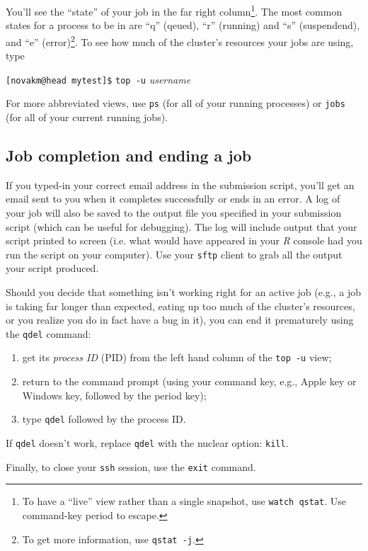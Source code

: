\documentclass[12pt,letterpaper]{article}
\begin{document}
\noindent
You'll see the ``state'' of your job in the far right column\footnote{To have a ``live'' view rather than a single snapshot, use \texttt{watch qstat}.  Use command-key period to escape.}.
The most common states for a process to be in are ``q'' (qeued), ``r'' (running) and ``s'' (suspendend), and ``e'' (error)\footnote{To get more information, use \texttt{qstat -j}.}.
To see how much of the cluster's resources your jobs are using, type

\texttt{[novakm@head mytest]\$} \texttt{top -u} \emph{username}

\noindent
For more abbreviated views, use \texttt{ps} (for all of your running processes) or \texttt{jobs} (for all of your current running jobs).


\subsection{Job completion and ending a job}
If you typed-in your correct email address in the submission script, you'll get an email sent to you when it completes successfully or ends in an error.
A log of your job will also be saved to the output file you specified in your submission script (which can be useful for debugging).
The log will include output that your script printed to screen (i.e. what would have appeared in your \emph{R} console had you run the script on your computer).
Use your \texttt{sftp} client to grab all the output your script produced.


Should you decide that something isn't working right for an active job (e.g., a job is taking far longer than expected, eating up too much of the cluster's resources, or you realize you do in fact have a bug in it), you can end it prematurely using the \texttt{qdel} command:
\begin{enumerate}
	\item get its \emph{process ID} (PID) from the left hand column of the \texttt{top -u} view;
	\item return to the command prompt (using your command key, e.g., Apple key or Windows key, followed by the period key);
	\item type \texttt{qdel} followed by the process ID.
\end{enumerate}
If \texttt{qdel} doesn't work, replace \texttt{qdel} with the nuclear option:  \texttt{kill}.


Finally, to close your \texttt{ssh} session, use the \texttt{exit} command.
\end{document}
